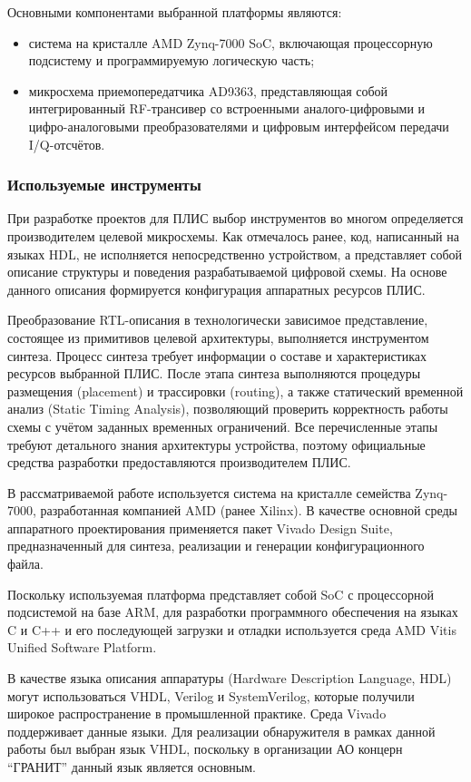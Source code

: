 Основными компонентами выбранной платформы являются:
\begin{itemize}
	\item система на кристалле AMD Zynq-7000 SoC, включающая процессорную подсистему и программируемую логическую часть;
	\item микросхема приемопередатчика AD9363\cite{ad9363}, представляющая собой интегрированный RF-трансивер со встроенными аналого-цифровыми и цифро-аналоговыми преобразователями и цифровым интерфейсом передачи I/Q-отсчётов.
\end{itemize}


\subsubsection{Используемые инструменты}

При разработке проектов для ПЛИС выбор инструментов во многом определяется производителем целевой микросхемы. Как отмечалось ранее, код, написанный на языках HDL, не исполняется непосредственно устройством, а представляет собой описание структуры и поведения разрабатываемой цифровой схемы. На основе данного описания формируется конфигурация аппаратных ресурсов ПЛИС.

Преобразование RTL-описания в технологически зависимое представление, состоящее из примитивов целевой архитектуры, выполняется инструментом синтеза. Процесс синтеза требует информации о составе и характеристиках ресурсов выбранной ПЛИС. После этапа синтеза выполняются процедуры размещения (placement) и трассировки (routing), а также статический временной анализ (Static Timing Analysis), позволяющий проверить корректность работы схемы с учётом заданных временных ограничений. Все перечисленные этапы требуют детального знания архитектуры устройства, поэтому официальные средства разработки предоставляются производителем ПЛИС.

В рассматриваемой работе используется система на кристалле семейства Zynq-7000, разработанная компанией AMD (ранее Xilinx). В качестве основной среды аппаратного проектирования применяется пакет Vivado Design Suite\cite{vivado}, предназначенный для синтеза, реализации и генерации конфигурационного файла. 

Поскольку используемая платформа представляет собой SoC с процессорной подсистемой на базе ARM, для разработки программного обеспечения на языках C и C++ и его последующей загрузки и отладки используется среда AMD Vitis Unified Software Platform\cite{vitis}.

В качестве языка описания аппаратуры (Hardware Description Language, HDL) могут использоваться VHDL\cite{vhdl}, Verilog\cite{verilog} и SystemVerilog\cite{system_verilog}, которые получили широкое распространение в промышленной практике. Среда Vivado поддерживает данные языки. Для реализации обнаружителя в рамках данной работы был выбран язык VHDL, поскольку в организации АО концерн \enquote{ГРАНИТ} данный язык является основным.


